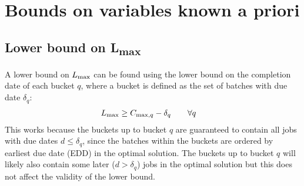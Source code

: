 \section{Bounds on variables known a priori}

\subsection[Lower bound on $\Lmax$]{Lower bound on {\sansitalicfont L}\textsubscript{max}}
A lower bound on $\Lmax$ can be found using the lower bound on the completion
date of each bucket $q$, where a bucket is defined as the set of batches with
due date $\delta_q$:
\begin{alignat}{2}
& L_{\text{max}} \geq C_{\text{max},q} - \delta_q \quad && \forall q
\end{alignat}
This works because the buckets up to bucket $q$ are guaranteed to contain all
jobs with due dates $d \leq \delta_q$, since the batches within the buckets are
ordered by earliest due date (EDD) in the optimal solution. The buckets up to
bucket $q$ will likely also contain some later ($d > \delta_q$) jobs in the
optimal solution but this does not affect the validity of the lower bound.

